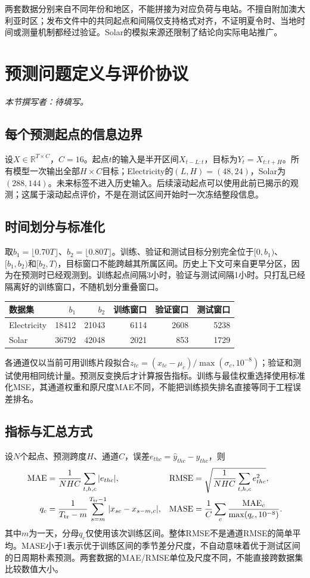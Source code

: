 \documentclass[10pt,a4paper]{article}
\begin{document}
两套数据分别来自不同年份和地区，不能拼接为对应负荷与电站。不擅自附加澳大利亚时区；发布文件中的共同起点和间隔仅支持格式对齐，不证明夏令时、当地时间或测量机制都经过验证。Solar的模拟来源还限制了结论向实际电站推广。

\clearpage
\section{预测问题定义与评价协议}
\noindent\textit{本节撰写者：待填写。}


\subsection{每个预测起点的信息边界}
设$X\in\mathbb R^{T\times C}$，$C=16$。起点$t$的输入是半开区间$X_{t-L:t}$，目标为$Y_t=X_{t:t+H}$。所有模型一次输出全部$H\times C$目标；Electricity的$(L,H)=(48,24)$，Solar为$(288,144)$。未来标签不进入历史输入。后续滚动起点可以使用此前已揭示的观测；这属于滚动起点评价，不是在测试区间开始时一次冻结整段信息。
\subsection{时间划分与标准化}
取$b_1=\lfloor0.70T\rfloor$、$b_2=\lfloor0.80T\rfloor$。训练、验证和测试目标分别完全位于$[0,b_1)$、$[b_1,b_2)$和$[b_2,T)$，目标窗口不能跨越其所属区间。历史上下文可来自更早分区，因为在预测时已经观测到。训练起点间隔3小时，验证与测试间隔1小时。只打乱已经隔离好的训练窗口，不随机划分重叠窗口。
\begin{center}\small
\begin{tabular}{lrrrrr}\toprule
数据集 & $b_1$ & $b_2$ & 训练窗口 & 验证窗口 & 测试窗口\\\midrule
Electricity & 18412 & 21043 & 6114 & 2608 & 5238\\
Solar & 36792 & 42048 & 2021 & 853 & 1729\\
\bottomrule\end{tabular}\end{center}

各通道仅以当前可用训练片段拟合$z_{tc}=(x_{tc}-\mu_c)/\max(\sigma_c,10^{-8})$；验证和测试使用相同统计量。预测反变换后才计算报告指标。训练与最佳权重选择使用标准化MSE，其通道权重和原尺度MAE不同，不能把训练损失排名直接等同于工程误差排名。
\subsection{指标与汇总方式}
设$N$个起点、预测跨度$H$、通道$C$，误差$e_{thc}=\hat y_{thc}-y_{thc}$，则
\begin{align}
\mathrm{MAE}&=\frac1{NHC}\sum_{t,h,c}|e_{thc}|,&\mathrm{RMSE}&=\sqrt{\frac1{NHC}\sum_{t,h,c}e_{thc}^2},\\
q_c&=\frac1{T_{\rm tr}-m}\sum_{s=m}^{T_{\rm tr}-1}|x_{sc}-x_{s-m,c}|,&\mathrm{MASE}&=\frac1C\sum_c\frac{\mathrm{MAE}_c}{\max(q_c,10^{-8})}.
\end{align}
其中$m$为一天，分母$q_c$仅使用该次训练区间\cite{mase}。整体RMSE不是通道RMSE的简单平均。MASE小于1表示优于训练区间的季节差分尺度，不自动意味着优于测试区间的日周期朴素预测。两套数据的MAE/RMSE单位及尺度不同，不能直接跨数据集比较数值大小。
\end{document}
